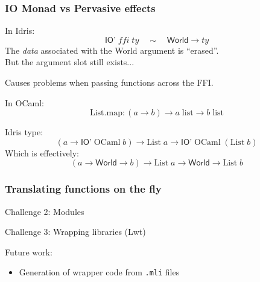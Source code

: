 \documentclass[aspectratio=169]{beamer}
\begin{document}
\begin{frame}[t]
  \frametitle{IO Monad vs Pervasive effects}

  In Idris:
  \begin{displaymath}
    \textsf{IO'}\;\mathit{ffi}\;\mathit{ty} \quad \sim \quad \textsf{World} \to \mathit{ty}
  \end{displaymath}
  The \textit{data} associated with the \textsf{World} argument is ``erased''. \\
  But the argument slot still exists...

  \bigskip

  Causes problems when passing functions across the FFI.

  \pause
  \bigskip

  In OCaml:
  \begin{displaymath}
    \mathrm{List.map} : (a \to b) \to a\;\mathrm{list} \to b\;\mathrm{list}
  \end{displaymath}

  Idris type:
  \begin{displaymath}
    (a \to \textsf{IO'}\;\mathrm{OCaml}\;b) \to \mathrm{List}\;a \to \textsf{IO'}\;\mathrm{OCaml}\;(\mathrm{List}\;b)
  \end{displaymath}
  \pause
  Which is effectively:
  \begin{displaymath}
    (a \to \textsf{World} \to b) \to \mathrm{List}\;a \to \textsf{World} \to \mathrm{List}\;b
  \end{displaymath}

\end{frame}

\begin{frame}[t]
  \frametitle{Translating functions on the fly}

  
\end{frame}

\begin{frame}
  Challenge 2: Modules
\end{frame}

\begin{frame}
  Challenge 3: Wrapping libraries (Lwt)
\end{frame}


\begin{frame}
  Future work:
  \begin{itemize}
    \item Generation of wrapper code from \texttt{.mli} files
  \end{itemize}
\end{frame}
\end{document}

